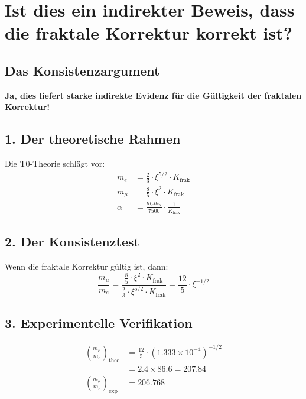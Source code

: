 \section{Ist dies ein indirekter Beweis, dass die fraktale Korrektur korrekt ist?}

\subsection{Das Konsistenzargument}

\begin{tcolorbox}[colback=green!5!white,colframe=green!75!black]
	\textbf{Ja, dies liefert starke indirekte Evidenz für die Gültigkeit der fraktalen Korrektur!}
\end{tcolorbox}

\subsection{1. Der theoretische Rahmen}

Die T0-Theorie schlägt vor:
\begin{align*}
	m_e &= \frac{2}{3} \cdot \xi^{5/2} \cdot K_{\text{frak}} \\
	m_\mu &= \frac{8}{5} \cdot \xi^2 \cdot K_{\text{frak}} \\
	\alpha &= \frac{m_e m_\mu}{7500} \cdot \frac{1}{K_{\text{frak}}}
\end{align*}

\subsection{2. Der Konsistenztest}

Wenn die fraktale Korrektur gültig ist, dann:
\[
\frac{m_\mu}{m_e} = \frac{\frac{8}{5} \cdot \xi^2 \cdot K_{\text{frak}}}{\frac{2}{3} \cdot \xi^{5/2} \cdot K_{\text{frak}}} = \frac{12}{5} \cdot \xi^{-1/2}
\]

\subsection{3. Experimentelle Verifikation}

\begin{align*}
	\left(\frac{m_\mu}{m_e}\right)_{\text{theo}} &= \frac{12}{5} \cdot (1.333 \times 10^{-4})^{-1/2} \\
	&= 2.4 \times 86.6 = 207.84 \\
	\left(\frac{m_\mu}{m_e}\right)_{\text{exp}} &= 206.768
\end{align*}

